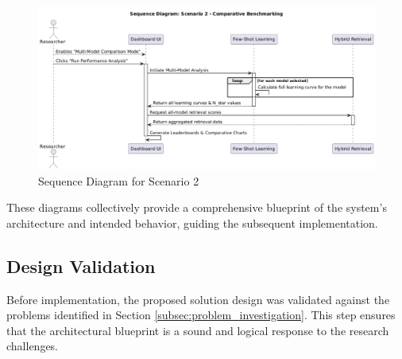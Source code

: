 \begin{figure}[H]
    \centering
    \includegraphics[width=\textwidth]{Images/sequence2.png}
    \caption{Sequence Diagram for Scenario 2}
    \label{fig:sequence2}
\end{figure}

These diagrams collectively provide a comprehensive blueprint of the system's architecture and intended behavior, guiding the subsequent implementation.

\subsection{Design Validation}
\label{subsec:design_validation}

Before implementation, the proposed solution design was validated against the problems identified in Section \ref{subsec:problem_investigation}. This step ensures that the architectural blueprint is a sound and logical response to the research challenges.

